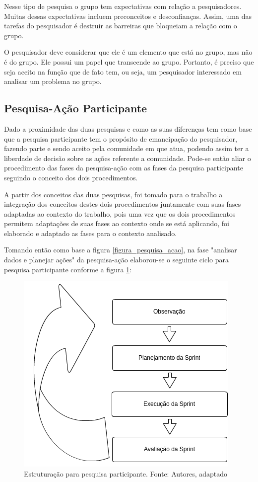Nesse tipo de pesquisa o grupo tem expectativas com relação a pesquisadores. Muitas dessas expectativas incluem preconceitos e desconfianças. Assim, uma das tarefas do pesquisador é destruir as barreiras que bloqueiam a relação com o grupo.

O pesquisador deve considerar que ele é um elemento que está no grupo, mas não é do grupo. Ele possui um papel que transcende ao grupo. Portanto, é preciso que seja aceito na função que de fato tem, ou seja, um pesquisador interessado em analisar um problema no grupo.

\subsection{Pesquisa-Ação Participante}

Dado a proximidade das duas pesquisas e como as suas diferenças tem como base que a pesquisa participante tem o propósito de emancipação do pesquisador, fazendo parte e sendo aceito pela comunidade em que atua, podendo assim ter a liberdade de decisão sobre as ações referente a comunidade. Pode-se então aliar o procedimento das fases da pesquisa-ação com as fases da pesquisa participante seguindo o conceito dos dois procedimentos.

A partir dos conceitos das duas pesquisas, foi tomado para o trabalho a integração dos conceitos destes dois procedimentos juntamente com suas fases adaptadas ao contexto do trabalho, pois uma vez que os dois procedimentos permitem adaptações de suas fases ao contexto onde se está aplicando, foi elaborado e adaptado as fases para o contexto analisado. 

Tomando então como base a figura \ref{figura_pesquisa_acao}, na fase "analisar dados e planejar ações" da pesquisa-ação elaborou-se o seguinte ciclo para pesquisa participante conforme a figura \ref{figura_pesquisa_participante}:

\begin{figure}[!htb]
	\centering
	\includegraphics[scale=0.6]{figuras/Fases_pesquisa_participante}
	\caption{Estruturação para pesquisa participante. Fonte: Autores, adaptado}
	\label{figura_pesquisa_participante}
\end{figure}

